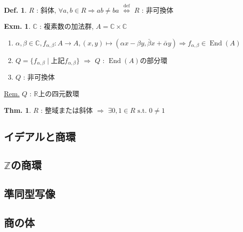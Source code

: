 \documentclass[uplatex,dvipdfmx,9pt]{beamer}
\newcommand{\defarrow}{\overset{\mathrm{def}}{\Leftrightarrow}}
\newcommand{\st}{\text{ s.t. }}
\newcommand{\End}{\operatorname{End}}
\newcommand{\sscount}{\textsection \thesubsection}
\newcounter{textExmCount}
\theoremstyle{definition} %
\newtheorem{defn}{Def.}[subsection] %
\newtheorem{thm}{Thm.}[subsection] %
\theoremstyle{example}
\newtheorem{exmText}[textExmCount]{Exm.}
\begin{document}
    \begin{frame}

      \begin{defn}
        $R$ : 斜体, $\forall a,b \in R \Rightarrow ab \neq ba$ $\defarrow$ $R$ : \alert{非可換体}
      \end{defn}

      \begin{exmText}
        $\mathbb{C}$ : 複素数の加法群, $A = \mathbb{C} \times \mathbb{C}$
        \begin{enumerate}
          \item $\alpha, \beta \in \mathbb{C}, f_{\alpha, \beta}\colon A \to A, (x,y) \mapsto (\alpha x - \beta y, \bar{\beta} x + \bar{\alpha} y) \Rightarrow f_{\alpha, \beta} \in \End(A)$
          \item $Q = \{f_{\alpha, \beta} \mid \text{上記$f_{\alpha, \beta}$}\}$ $\Rightarrow$ $Q$ : $\End(A)$の部分環
          \item $Q$ : 非可換体
        \end{enumerate}
      \end{exmText}
      \underline{Rem.} $Q$ : $\mathbb{R}$上の\alert{四元数環}

      \begin{thm}
        $R$ : 整域または斜体 $\Rightarrow$ $\exists 0, 1 \in R \st 0 \neq 1$
      \end{thm}
      
    \end{frame}

    \subsection{\sscount イデアルと商環}
    \setcounter{textExmCount}{0}

    \subsection{\sscount \texorpdfstring{ $\mathbb{Z}$}{Z}の商環}
    \setcounter{textExmCount}{0}

    \subsection{\sscount 準同型写像}
    \setcounter{textExmCount}{0}

    \subsection{\sscount 商の体}
    \setcounter{textExmCount}{0}
\end{document}
